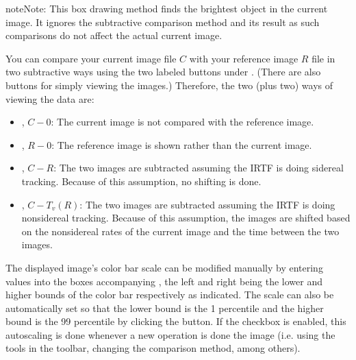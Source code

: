 \documentclass[letterpaper,11pt,english]{sphinxmanual}
\begin{document}
\begin{sphinxadmonition}{note}{Note:}
\sphinxAtStartPar
This box drawing method finds the brightest object in the current image.
It ignores the subtractive comparison method and its result as such
comparisons do not affect the actual current image.
\end{sphinxadmonition}

\sphinxAtStartPar
You can compare your current image file \(C\) with your reference image
\(R\) file in two subtractive ways using the two labeled buttons under
. (There are also buttons for simply viewing
the images.) Therefore, the two (plus two) ways of viewing the data are:
\begin{itemize}
\item {} 
\sphinxAtStartPar
{}, \(C-0\): The current image is not compared with the reference image.

\item {} 
\sphinxAtStartPar
{}, \(R-0\): The reference image is shown rather than the current image.

\item {} 
\sphinxAtStartPar
{}, \(C-R\): The two images are subtracted assuming the IRTF is doing sidereal tracking. Because of this assumption, no shifting is done.

\item {} 
\sphinxAtStartPar
{}, \(C-T_v(R)\): The two images are subtracted assuming the IRTF is doing non\sphinxhyphen{}sidereal tracking. Because of this assumption, the images are shifted based on the non\sphinxhyphen{}sidereal rates of the current image and the time between the two images.

\end{itemize}

\sphinxAtStartPar
The displayed image’s color bar scale can be modified manually by entering
values into the boxes accompanying , the left and
right being the lower and higher bounds of the color bar respectively as
indicated. The scale can also be automatically set so that the lower bound is
the 1 percentile and the higher bound is the 99 percentile by clicking the
 button. If the  checkbox is enabled,
this autoscaling is done whenever a new operation is done the image (i.e.
using the tools in the toolbar, changing the comparison method, among others).
\end{document}
